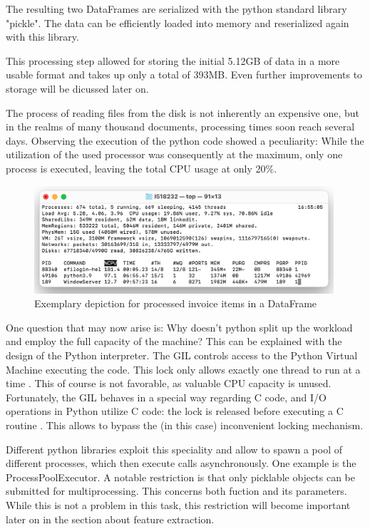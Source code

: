 	The resulting two DataFrames are serialized with the python standard library "pickle".  The data can be efficiently loaded into memory and reserialized again with this library.
	
	This processing step allowed for storing the initial 5.12GB of data in a more usable format and takes up only a total of 393MB. Even further improvements to storage will be dicussed later on.

	The process of reading files from the disk is not inherently an expensive one, but in the realms of many thousand documents, processing times soon reach several days. Observing the execution of the python code showed a peculiarity: While the utilization of the used processor was consequently at the maximum, only one process is executed, leaving the total CPU usage at only 20\%. 
	
	\begin{figure}[ht]
		\centering
		\includegraphics[height=4cm]{Bilder/practical/python_processes.png}
		\caption{Exemplary depiction for processed invoice items in a DataFrame}
		\label{fig:df-invoices}
	\end{figure}
	
	
	One question that may now arise is: Why doesn't python split up the workload and employ the full capacity of the machine?
	This can be explained with the design of the Python interpreter. The \ac{GIL} controls access to the Python Virtual Machine executing the code. This lock only allows exactly one thread to run at a time \cite{corePython}. This of course is not favorable, as valuable CPU capacity is unused. Fortunately, the \ac{GIL} behaves in a special way regarding C code, and I/O operations in Python utilize C code: the lock is released before executing a C routine \cite{corePython}. This allows to bypass the (in this case) inconvenient locking mechanism. 
	
	Different python libraries exploit this speciality and allow to spawn a pool of different processes, which then execute calls asynchronously. One example is the ProcessPoolExecutor. A notable restriction is that only picklable objects can be submitted for multiprocessing. This concerns both fuction and its parameters. While this is not a problem in this task, this restriction will become important later on in the section about feature extraction.
	


